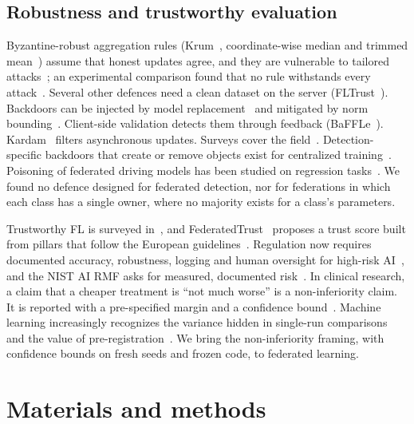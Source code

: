 \documentclass[pdflatex,sn-mathphys-num]{sn-jnl}
\begin{document}
\subsection{Robustness and trustworthy evaluation}
Byzantine-robust aggregation rules (Krum~\cite{blanchard2017krum}, coordinate-wise median and trimmed mean~\cite{yin2018byzantine}) assume that honest updates agree, and they are vulnerable to tailored attacks~\cite{fang2020local}; an experimental comparison found that no rule withstands every attack~\cite{li2024byzantinestudy}. Several other defences need a clean dataset on the server (FLTrust~\cite{cao2021fltrust}). Backdoors can be injected by model replacement~\cite{bagdasaryan2020backdoor} and mitigated by norm bounding~\cite{sun2019backdoor}. Client-side validation detects them through feedback (BaFFLe~\cite{andreina2021baffle}). Kardam~\cite{damaskinos2018kardam} filters asynchronous updates. Surveys cover the field~\cite{xia2023poisoningsurvey}. Detection-specific backdoors that create or remove objects exist for centralized training~\cite{chan2022baddet}. Poisoning of federated driving models has been studied on regression tasks~\cite{garg2024poisoningad}. We found no defence designed for federated detection, nor for federations in which each class has a single owner, where no majority exists for a class's parameters.

Trustworthy FL is surveyed in~\cite{tariq2023trustworthy}, and FederatedTrust~\cite{sanchez2023federatedtrust} proposes a trust score built from pillars that follow the European guidelines~\cite{hleg2019ethics}. Regulation now requires documented accuracy, robustness, logging and human oversight for high-risk AI~\cite{euaiact2024}, and the NIST AI RMF asks for measured, documented risk~\cite{nist2023rmf}. In clinical research, a claim that a cheaper treatment is ``not much worse'' is a non-inferiority claim. It is reported with a pre-specified margin and a confidence bound~\cite{piaggio2012consort}. Machine learning increasingly recognizes the variance hidden in single-run comparisons~\cite{bouthillier2021variance} and the value of pre-registration~\cite{nosek2018prereg}. We bring the non-inferiority framing, with confidence bounds on fresh seeds and frozen code, to federated learning.

\section{Materials and methods}\label{sec:methods}
\end{document}
